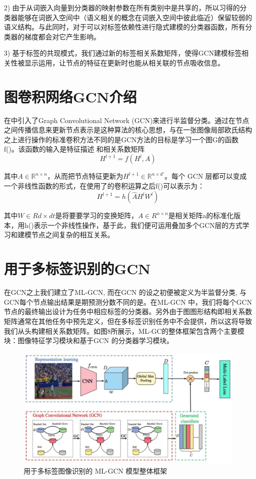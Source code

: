 2) 由于从词嵌入向量到分类器的映射参数在所有类别中是共享的，所以习得的分类器能够在词嵌入空间中（语义相关的概念在词嵌入空间中彼此临近）保留较弱的语义结构。与此同时，对于可以对标签依赖性进行隐式建模的分类器函数，所有分类器的梯度都会对它产生影响。

3) 基于标签的共现模式，我们通过新的标签相关系数矩阵，使得GCN建模标签相关性被显示运用，让节点的特征在更新时也能从相关联的节点吸收信息。

\section{图卷积网络GCN介绍}
在\cite{Li2014Multi}中引入了Graph Convolutional Network (GCN)来进行半监督分类。通过在节点之间传播信息来更新节点表示是这种算法的核心思想，与在一张图像局部欧氏结构之上进行操作的标准卷积方法不同的是GCN方法的目标是学习一个图G的函数f()。该函数的输入是特征描述  和相关系数矩阵
\begin{equation}
\label{dscNoStgProof0}
H^{l+1} = f(H^l, A)
\end{equation}

其中$A\in \mathbb{R}^{n\times n}$，从而把节点特征更新为$H^{l+1}\in \mathbb{R}^{n\times d'}$。每个 GCN 层都可以变成一个非线性函数的形式，在使用了\cite{Li2014Multi}的卷积运算之后f()可以表示为：
\begin{equation}
\label{dscNoStgProof0}
H^{l+1} = h(\hat{A}H^l W^l)
\end{equation}

其中$W\in Rd\times dt$是将要要学习的变换矩阵，$A\in R^{n\times n}$是相关矩阵a的标准化版本，用h()表示一个非线性操作，基于此，我们便可运用叠加多个GCN层的方式学习和建模节点之间复杂的相互关系。


\section{用于多标签识别的GCN}

在GCN之上我们建立了ML-GCN, 	而在GCN 的设之初便被定义为半监督分类, 与GCN每个节点输出结果是期预测分数不同的是。在ML-GCN 中，我们将每个GCN节点的最终输出设计为任务中相应标签的分类器。另外由于图图形结构即相关系数矩阵通常在其他任务中预先定义，但在多标签识别任务中不会提供，所以这将导致我们从头构建相关系数矩阵。如图8所展示，ML-GC的整体框架包含两个主要模块：图像特征学习模块和基于GCN 的分类器学习模块。

\begin{figure}[htbp!]
	\centering
	\includegraphics[width=12cm, height=6cm]{figures/p3-1.jpg}
	\caption{用于多标签图像识别的 ML-GCN 模型整体框架}\label{fig:simuP1P2Result}
	\vspace{-1em}
\end{figure}

